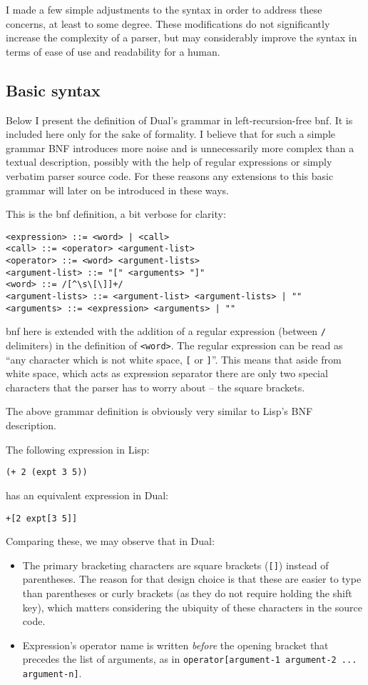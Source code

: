 I made a few simple adjustments to the syntax in order to address these concerns, at least to some degree. These modifications do not significantly increase the complexity of a parser, but may considerably improve the syntax in terms of ease of use and readability for a human.

\subsection{Basic syntax}
Below I present the definition of Dual's grammar in left-recursion-free \acrlong{bnf}. It is included here only for the sake of formality. I believe that for such a simple grammar BNF introduces more noise and is unnecessarily more complex than a textual description, possibly with the help of regular expressions or simply verbatim parser source code. For these reasons any extensions to this basic grammar will later on be introduced in these ways.

This is the \acrshort{bnf} definition, a bit verbose for clarity:
\begin{lstlisting}
<expression> ::= <word> | <call>
<call> ::= <operator> <argument-list>
<operator> ::= <word> <argument-lists>
<argument-list> ::= "[" <arguments> "]"
<word> ::= /[^\s\[\]]+/
<argument-lists> ::= <argument-list> <argument-lists> | ""
<arguments> ::= <expression> <arguments> | ""
\end{lstlisting}

\acrshort{bnf} here is extended with the addition of a regular expression (between \texttt{/} delimiters) in the definition of \texttt{<word>}. The regular expression can be read as ``any character which is not white space,
\texttt{[} or \texttt{]}''. This means that aside from white space, which acts as
expression separator there are only two special characters that the parser has to worry about -- the square brackets.

The above grammar definition is obviously very similar to Lisp's BNF description\cite{lisp_bnf_1, lisp_bnf_2}.

The following expression in Lisp:
\begin{lstlisting}
(+ 2 (expt 3 5))
\end{lstlisting}

has an equivalent expression in Dual:
\begin{lstlisting}
+[2 expt[3 5]]
\end{lstlisting}

Comparing these, we may observe that in Dual:
\begin{itemize}
    \item The primary bracketing characters are square brackets (\texttt{[]})
    instead of parentheses. The reason for that design choice is that these
    are easier to type than parentheses or curly brackets (as they do not
    require holding the shift key), which matters considering the ubiquity of
    these characters in the source code.
    \item Expression's operator name is written \textit{before} the opening bracket that precedes the list of arguments, as in \texttt{operator[argument-1 argument-2 ... argument-n]}.
\end{itemize}

